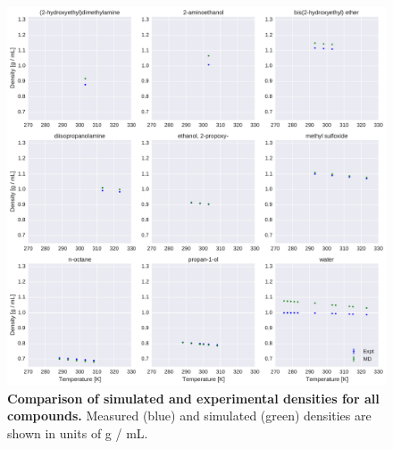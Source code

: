 \documentclass[aps,pre,twocolumn,nofootinbib,superscriptaddress,linenumbers]{revtex4-1}
\begin{document}
\begin{figure}[alldensity]


\ContinuedFloat

\includegraphics[width=\textwidth]{./figures/densities_versus_temperature_part1.pdf}

\caption{{\bf Comparison of simulated and experimental densities for all compounds.} 
Measured (blue) and simulated (green) densities are shown in units of g / mL.
\label{figure:AllDensities}
}

\end{figure}
\end{document}
